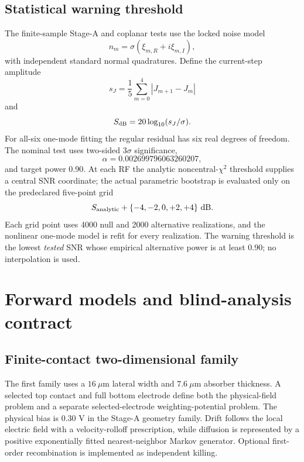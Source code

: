 \documentclass[11pt]{article}
\begin{document}
\subsection{Statistical warning threshold}

The finite-sample Stage-A and coplanar tests use the locked noise model
\begin{equation}
n_m=\sigma(\xi_{m,R}+i\xi_{m,I}),
\end{equation}
with independent standard normal quadratures. Define the current-step amplitude
\begin{equation}
s_J=\frac{1}{5}\sum_{m=0}^{4}|J_{m+1}-J_m|
\end{equation}
and
\begin{equation}
S_{\rm dB}=20\log_{10}(s_J/\sigma).
\label{eq:snr}
\end{equation}
For all-six one-mode fitting the regular residual has six real degrees of freedom. The nominal test uses two-sided $3\sigma$ significance,
\begin{equation}
\alpha=0.002699796063260207,
\end{equation}
and target power 0.90. At each RF the analytic noncentral-$\chi^2$ threshold supplies a central SNR coordinate; the actual parametric bootstrap is evaluated only on the predeclared five-point grid
\begin{equation}
S_{\rm analytic}+\{-4,-2,0,+2,+4\}\ \mathrm{dB}.
\end{equation}
Each grid point uses 4000 null and 2000 alternative realizations, and the nonlinear one-mode model is refit for every realization. The warning threshold is the lowest \emph{tested} SNR whose empirical alternative power is at least 0.90; no interpolation is used.

\section{Forward models and blind-analysis contract}

\subsection{Finite-contact two-dimensional family}

The first family uses a $16~\mu\mathrm{m}$ lateral width and $7.6~\mu\mathrm{m}$ absorber thickness. A selected top contact and full bottom electrode define both the physical-field problem and a separate selected-electrode weighting-potential problem. The physical bias is 0.30 V in the Stage-A geometry family. Drift follows the local electric field with a velocity-rolloff prescription, while diffusion is represented by a positive exponentially fitted nearest-neighbor Markov generator. Optional first-order recombination is implemented as independent killing.
\end{document}
